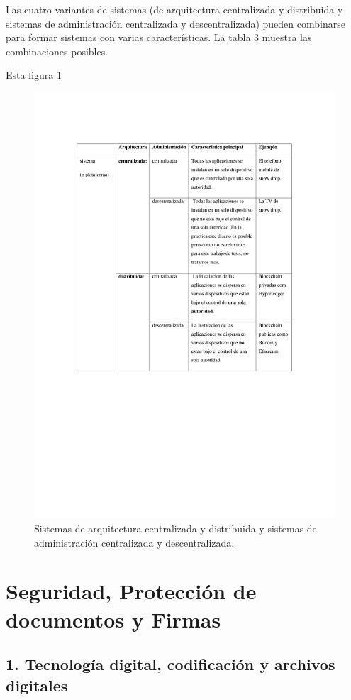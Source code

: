 \documentclass[12pt]{report} %
\begin{document}
\begin{itemize}
Las cuatro variantes de sistemas (de arquitectura centralizada y distribuida y sistemas de administración centralizada y descentralizada) pueden combinarse para formar sistemas con varias características. La tabla 3 muestra las combinaciones posibles.

Esta figura \ref{imagendesc7).pdf}


\begin{figure}
\centering
\includegraphics[width=0.85\columnwidth]{imagenes/imagendesc7).pdf}
\caption{Sistemas de arquitectura centralizada y distribuida y sistemas  de administración centralizada y descentralizada.}
\label{imagendesc7).pdf}
\end{figure} 


\chapter{Seguridad, Protección de documentos y Firmas}
\label{Seguridad, Protección de documentos y Firmas}

\section{1.	Tecnología digital, codificación y archivos digitales}


\end{itemize}
\end{document}

